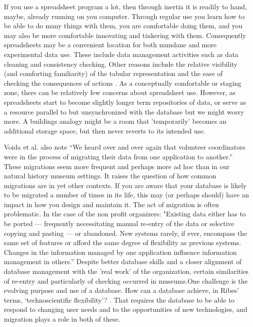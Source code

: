 If you use a spreadsheet program a lot, then through inertia it is readily to hand, maybe, already running on you computer. Through regular use you learn how to be able to do many things with them, you are comfortable doing them, and you may also be more comfortable innovating and tinkering with them. Consequently spreadsheets may be a convenient location for both mundane and more experimental data use. These include data management activities such as data cleaning and consistency checking. Other reasons include the relative visibility (and comforting familiarity) of the tabular representation and the ease of checking the consequences of actions \cite{nardi1991twinkling}. As a conceptually comfortable or staging zone, there can be relatively few concerns about spreadsheet use. However, as spreadsheets start to become slightly longer term repositories of data, or serve as a resource parallel to but unsynchronized with the database but we might worry more. A buildings analogy might be a room that ’temporarily’ becomes an additional storage space, but then never reverts to its intended use.

Voida et al. also note “We heard over and over again that volunteer coordinators were in the process of migrating their data from one application to another.” These migrations seem more frequent and perhaps more ad hoc than in our natural history museum settings. It raises the question of how common migrations are in yet other contexts. If you are aware that your database is likely to be migrated a number of times in its life, this may (or perhaps should) have an impact in how you design and maintain it. The act of migration is often problematic. In the case of the non profit organizers: "Existing data either has to be ported — frequently necessitating manual re-entry of the data or selective copying and pasting — or abandoned. New systems rarely, if ever, encompass the same set of features or afford the same degree of flexibility as previous systems. Changes in the information managed by one application influence information management in others.” Despite better database skills and a closer alignment of database management with the ’real work’ of the organization, certain similarities of re-entry and particularly of checking occurred in museums.One challenge is the evolving purpose and use of a database. How can a database achieve, in Ribes’ terms, ‘technoscientific flexibility’? \cite{ribes2014kernel}. 
That requires the database to be able to respond to changing user needs and to the opportunities of new technologies, and migration plays a role in both of these.
